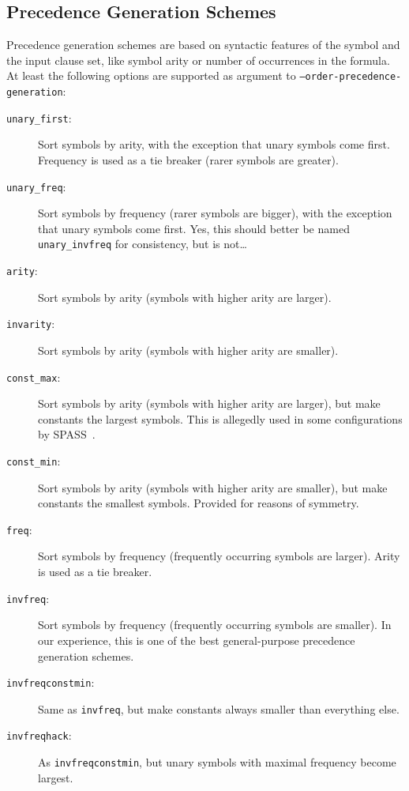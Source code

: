 \documentclass{report}
\begin{document}
\subsection{Precedence Generation Schemes}

Precedence generation schemes are based on syntactic features of the
symbol and the input clause set, like symbol arity or number of
occurrences in the formula. At least the following options are
supported as argument to \texttt{--order-precedence-generation}:

\begin{description}
\item[\texttt{unary\_first}:] Sort symbols by arity, with the
  exception that unary symbols come first. Frequency is used as a
  tie breaker (rarer symbols are greater).
\item[\texttt{unary\_freq}:] Sort symbols by frequency (rarer symbols
  are bigger), with the exception that unary symbols come first. Yes,
  this should better be named \texttt{unary\_invfreq} for
  consistency, but is not\ldots
\item[\texttt{arity}:] Sort symbols by arity (symbols with higher
  arity are larger).
\item[\texttt{invarity}:] Sort symbols by arity (symbols with higher
  arity are smaller).
\item[\texttt{const\_max}:] Sort symbols by arity (symbols with higher
  arity are larger), but make constants the largest symbols. This is allegedly
  used in some configurations by SPASS~\cite{Weidenbach:SPASS-2001}.
\item[\texttt{const\_min}:] Sort symbols by arity (symbols with higher
  arity are smaller), but make constants the smallest symbols.
  Provided for reasons of symmetry.
\item[\texttt{freq}:] Sort symbols by frequency (frequently occurring
  symbols are larger). Arity is used as a tie breaker.
\item[\texttt{invfreq}:] Sort symbols by frequency (frequently occurring
  symbols are smaller). In our experience, this is one of the best
  general-purpose precedence generation schemes.
\item[\texttt{invfreqconstmin}:] Same as \texttt{invfreq}, but make
  constants always smaller than everything else.
\item[\texttt{invfreqhack}:] As \texttt{invfreqconstmin}, but unary
  symbols with maximal frequency become largest.
\end{description}
\end{document}
